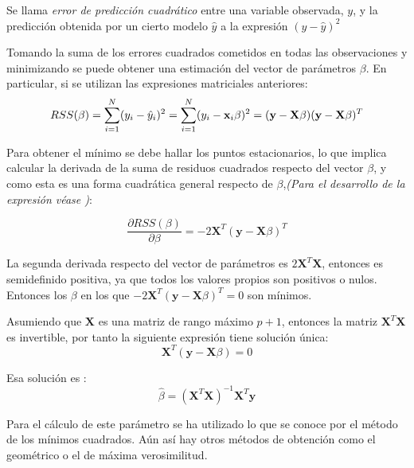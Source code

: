 \begin{defi}
Se llama \emph{error de predicción cuadrático} entre una variable observada, $y$, y la predicción obtenida por un cierto modelo $\hat{y}$ a la expresión $(y-\hat{y})^2$
\end{defi}

\noindent Tomando la suma de los errores cuadrados cometidos en todas las observaciones y minimizando se puede obtener una estimación del vector de parámetros $\beta$. En particular, si se utilizan las expresiones matriciales  anteriores:
\begin{equation}
RSS(\beta)=\sum_{i=1}^N(y_i-\hat{y}_i)^2 = \sum_{i=1}^N(y_i-\textbf{x}_i\beta)^2=(\textbf{y}-\textbf{X}\beta)(\textbf{y}-\textbf{X}\beta)^T\\
\end{equation}

\noindent Para obtener el mínimo se debe hallar los puntos estacionarios, lo que implica calcular la derivada de la suma de residuos cuadrados respecto del vector $\beta$, y como esta es una forma cuadrática general respecto de $\beta$,\emph{(Para el desarrollo de la expresión véase \cite{Morrison 1976})}:

\begin{equation}
\dfrac{\partial RSS(\beta)}{\partial \beta}= -2\mathbf{X}^T(\mathbf{y}-\mathbf{X}\beta)^T
\end{equation}

\noindent La segunda derivada respecto del vector de parámetros es $2\mathbf{X}^T\mathbf{X}$, entonces es  semidefinido positiva, ya que todos los valores propios son positivos o nulos. Entonces los $\beta$ en los que $-2\mathbf{X}^T(\mathbf{y}-\mathbf{X}\beta)^T=0$ son mínimos.  

\noindent Asumiendo que $\textbf{X}$ es una matriz de rango máximo $p+1$, entonces la matriz $\mathbf{X}^T \mathbf{X}$ es invertible, por tanto la  siguiente expresión tiene solución única: 
\begin{equation}
\textbf{X}^T(\textbf{y}-\textbf{X}\beta)=0
\end{equation}

\noindent Esa solución es :
\begin{equation}
\hat{\beta}=(\textbf{X}^T\textbf{X})^{-1}\textbf{X}^T\textbf{y}
\end{equation}

\noindent Para el cálculo de este parámetro se ha utilizado lo que se conoce por el método de los mínimos cuadrados. Aún así hay otros métodos de obtención como el geométrico o el de máxima verosimilitud. 

